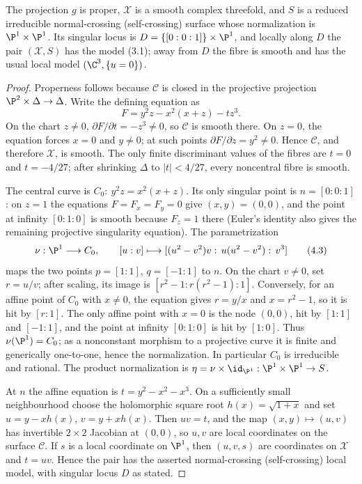 \begin{proposition}
\label{prop:family-geometry}
The projection $g$ is proper, $\mathcal X$ is a smooth complex threefold,
  and $S$ is a reduced irreducible normal-crossing (self-crossing) surface whose normalization
is $\P^1\times\P^1$.  Its singular locus is
\(D=\{[0:0:1]\}\times\P^1\), and locally along $D$ the pair $(\mathcal X,S)$
has the model (3.1); away from $D$ the fibre is smooth and has the usual
local model $(\C^3,\{u=0\})$.
\end{proposition}

\begin{proof}
Properness follows because $\mathscr C$ is closed in the projective
projection $\P^2\times\Delta\to\Delta$.  Write the defining equation as
\[
 F=y^2z-x^2(x+z)-tz^3.
\]
On the chart $z\ne0$, $\partial F/\partial t=-z^3\ne0$, so $\mathscr C$
is smooth there.  On $z=0$, the equation forces $x=0$ and $y\ne0$; at such
points $\partial F/\partial z=y^2\ne0$.  Hence $\mathscr C$, and therefore
$\mathcal X$, is smooth.  The only finite discriminant values of the fibres
are $t=0$ and $t=-4/27$; after shrinking $\Delta$ to $|t|<4/27$, every
noncentral fibre is smooth.

The central curve is
\(C_0:\ y^2z=x^2(x+z)\).  Its only singular point is
\(n=[0:0:1]\): on $z=1$ the equations $F=F_x=F_y=0$ give $(x,y)=(0,0)$,
and the point at infinity $[0:1:0]$ is smooth because $F_z=1$ there
(Euler's identity also gives the remaining projective singularity equation).
The parametrization
\[
 \nu:\P^1\longrightarrow C_0,\qquad
 [u:v]\longmapsto
 [(u^2-v^2)v:\,u(u^2-v^2):\,v^3]
 \tag{4.3}
\]
maps the two points $p=[1:1]$, $q=[-1:1]$ to $n$.  On the chart $v\ne0$, set
$r=u/v$; after scaling, its image is
$[r^2-1:r(r^2-1):1]$.  Conversely, for an affine point of $C_0$ with
$x\ne0$, the equation gives $r=y/x$ and $x=r^2-1$, so it is hit by
$[r:1]$.  The only affine point with $x=0$ is the node $(0,0)$, hit by
$[1:1]$ and $[-1:1]$, and the point at infinity $[0:1:0]$ is hit by
$[1:0]$.  Thus $\nu(\P^1)=C_0$; as a nonconstant morphism to a projective
curve it is finite and generically one-to-one, hence the normalization.  In
particular $C_0$ is irreducible and rational.  The product normalization
is $\eta=\nu\times\id_{\P^1}:\P^1\times\P^1\to S$.

At $n$ the affine equation is
\(t=y^2-x^2-x^3\).  On a sufficiently small neighbourhood choose the
holomorphic square root $h(x)=\sqrt{1+x}$ and set
\(u=y-xh(x)\), \(v=y+xh(x)\).  Then $uv=t$, and the map
$(x,y)\mapsto(u,v)$ has invertible $2\times2$ Jacobian at $(0,0)$, so $u,v$
are local coordinates on the surface $\mathscr C$.  If $s$ is a local
coordinate on $\P^1$, then $(u,v,s)$ are coordinates on $\mathcal X$ and
$t=uv$.  Hence the pair has the asserted normal-crossing (self-crossing)
local model, with singular locus $D$ as stated.
\end{proof}

